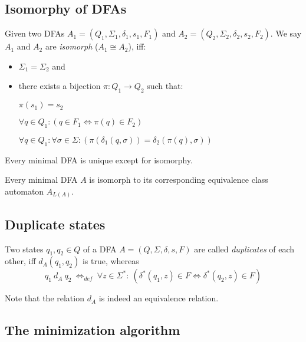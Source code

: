 \subsection{Isomorphy of DFAs}

Given two DFAs $A_1 = (Q_1, \Sigma_1, \delta_1, s_1, F_1)$ and $A_2 = (Q_2, \Sigma_2, \delta_2, s_2, F_2)$. We say $A_1$ and $A_2$ are \emph{isomorph} ($A_1 \cong A_2$), iff:
\begin{itemize}
	\item $\Sigma_1 = \Sigma_2$ and
	\item there exists a bijection $\pi\colon Q_1 \to Q_2$ such that:
	
	$\pi(s_1) = s_2$
	
	$\forall q\in Q_1\colon (q\in F_1 \Longleftrightarrow \pi(q)\in F_2)$
	
	$\forall q\in Q_1\colon \forall\sigma\in\Sigma\colon (\pi(\delta_1(q,\sigma))=\delta_2(\pi(q),\sigma))$
\end{itemize}
\begin{theorem} \textnormal{\cite[p. 45]{schoening01}} 
	Every minimal DFA is unique except for isomorphy.
\end{theorem}
\begin{corollary}
	Every minimal DFA $A$ is isomorph to its corresponding equivalence class automaton $A_{L(A)}$.
\end{corollary}

\subsection{Duplicate states}

\begin{definition}\cite[p. 154]{hopcroft01}
	Two states $q_1, q_2 \in Q$ of a DFA $A = (Q, \Sigma, \delta, s, F)$ are called \emph{duplicates} of each other, iff $d_A(q_1, q_2)$ is true, whereas
	\begin{displaymath}
	q_1\ d_A\ q_2\ \Leftrightarrow_{def}\ \forall z \in \Sigma^* \colon\ (\delta^*(q_1, z) \in F \Leftrightarrow \delta^*(q_2, z) \in F)
	\end{displaymath}
\end{definition}
\noindent Note that the relation $d_A$ is indeed an equivalence relation.

\subsection{The minimization algorithm}


